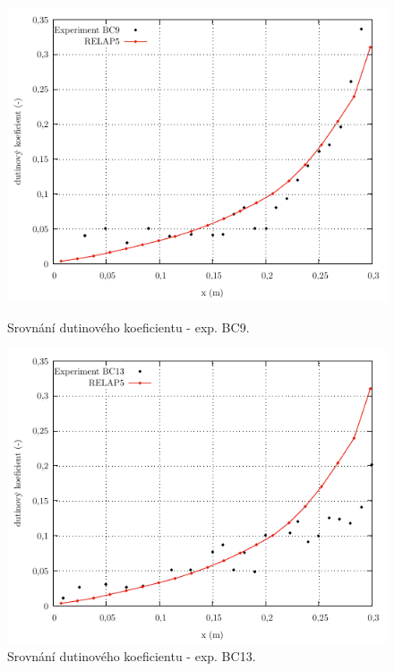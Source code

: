 \begin{figure}[p]
	\centering
	\begin{minipage}{.5\textwidth}
		\centering
		\includegraphics[width=\linewidth]{./03_benchmark/grafy/srovnani_exp3.pdf}
		\caption{Srovnání dutinového koeficientu - exp. BC9.}
		\label{fig:zeitoun_bc9}
	\end{minipage}%
	\begin{minipage}{.5\textwidth}
		\centering
		\includegraphics[width=\linewidth]{./03_benchmark/grafy/srovnani_exp4.pdf}
		\caption{Srovnání dutinového koeficientu - exp. BC13.}
		\label{fig:zeitoun_bc13}
	\end{minipage}
\end{figure}